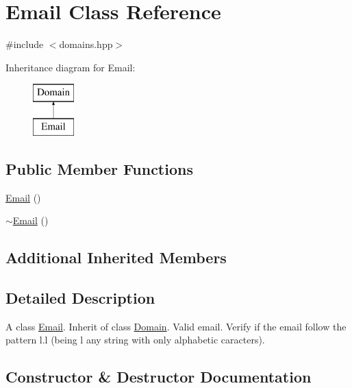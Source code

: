 \hypertarget{class_email}{}\section{Email Class Reference}
\label{class_email}


{\ttfamily \#include $<$domains.\+hpp$>$}

Inheritance diagram for Email\+:\begin{figure}[H]
\begin{center}
\leavevmode
\includegraphics[height=2.000000cm]{class_email}
\end{center}
\end{figure}
\subsection*{Public Member Functions}
\begin{DoxyCompactItemize}
\item 
\hyperlink{class_email_a2cfcfea1e55511208e7858c33f48ad9d}{Email} ()
\item 
\hyperlink{class_email_a3e56bac4e1d6170fb5ba3ece6efb89a3}{$\sim$\+Email} ()
\end{DoxyCompactItemize}
\subsection*{Additional Inherited Members}


\subsection{Detailed Description}
A class \hyperlink{class_email}{Email}. Inherit of class \hyperlink{class_domain}{Domain}. Valid email. Verify if the email follow the pattern l.l (being l any string with only alphabetic caracters). 

\subsection{Constructor \& Destructor Documentation}
\mbox{\label{class_email_a2cfcfea1e55511208e7858c33f48ad9d}} 
